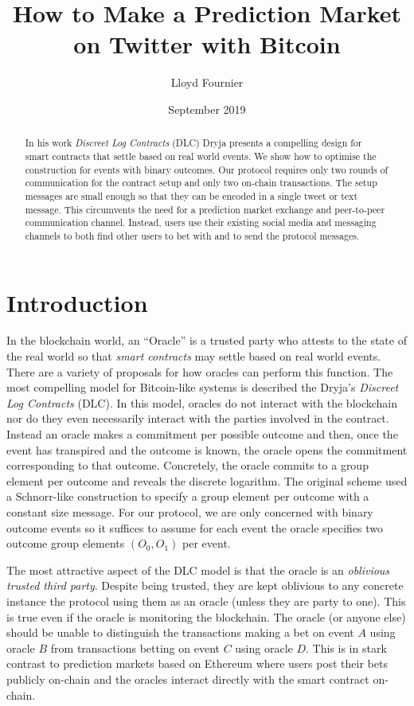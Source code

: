 \documentclass[runningheads]{llncs}
\begin{document}
\title{How to Make a Prediction Market on Twitter with Bitcoin}
\author{Lloyd Fournier}
\date{September 2019}

\maketitle

\begin{abstract}
In his work \emph{Discreet Log Contracts} (DLC) Dryja presents a compelling design for smart contracts that settle based on real world events. We show how to optimise the construction for events with binary outcomes. Our protocol requires only two rounds of communication for the contract setup and only two on-chain transactions. The setup messages are small enough so that they can be encoded in a single tweet or text message. This circumvents the need for a prediction market exchange and peer-to-peer communication channel. Instead, users use their existing social media and messaging channels to both find other users to bet with and to send the protocol messages.
\end{abstract}


\section{Introduction}

In the blockchain world, an ``Oracle'' is a trusted party who attests to the state of the real world so that \emph{smart contracts} may settle based on real world events. There are a variety of proposals for how oracles can perform this function. The most compelling model for Bitcoin-like systems is described the Dryja's \textit{Discreet Log Contracts} (DLC)\cite{DLC}. In this model, oracles do not interact with the blockchain nor do they even necessarily interact with the parties involved in the contract. Instead an oracle makes a commitment per possible outcome and then, once the event has transpired and the outcome is known, the oracle opens the commitment corresponding to that outcome. Concretely, the oracle commits to a group element per outcome and reveals the discrete logarithm. The original scheme used a Schnorr-like construction to specify a group element per outcome with a constant size message. For our protocol, we are only concerned with binary outcome events so it suffices to assume for each event the oracle specifies two outcome group elements $(O_0,O_1)$ per event.

The most attractive aspect of the DLC model is that the oracle is an \emph{oblivious trusted third party}\cite{cryptoeprint:2011:319}. Despite being trusted, they are kept oblivious to any concrete instance the protocol using them as an oracle (unless they are party to one). This is true even if the oracle is monitoring the blockchain. The oracle (or anyone else) should be unable to distinguish the transactions making a bet on event $A$ using oracle $B$ from transactions betting on event $C$ using oracle $D$. This is in stark contrast to prediction markets based on Ethereum\cite{augur} where users post their bets publicly on-chain and the oracles interact directly with the smart contract on-chain.
\end{document}
